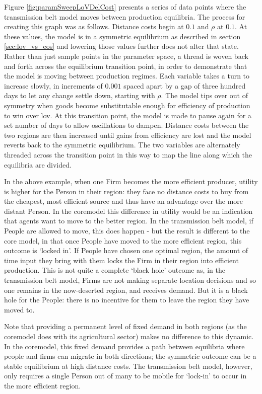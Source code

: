 Figure \ref{fig:paramSweepLoVDelCost} presents a series of data points where the transmission belt model moves between production equilibria. The process for creating this graph was as follows. Distance costs begin at $0.1$ and $\rho$ at $0.1$. At these values, the model is in a symmetric equilibrium as described in section \ref{sec:lov_vs_eos} and lowering those values further does not alter that state. Rather than just sample points in the parameter space, a thread is woven back and forth across the equilibrium transition point, in order to demonstrate that the model is moving between production regimes. Each variable takes a turn to increase slowly, in increments of $0.001$ spaced apart by a gap of three hundred days to let any change settle down, starting with $\rho$. The model tips over out of symmetry when goods become substitutable enough for efficiency of production to win over \gls{lov}. At this transition point, the model is made to pause again for a set number of days to allow oscillations to dampen. Distance costs between the two regions are then increased until gains from efficiency are lost and the model reverts back to the symmetric equilibrium. The two variables are alternately threaded across the transition point in this way to map the line along which the equilibria are divided.

In the above example, when one Firm becomes the more efficient producer, utility is higher for the Person in their region: they face no distance costs to buy from the cheapest, most efficient source and thus have an advantage over the more distant Person. In the \gls{coremodel} this difference in utility would be an indication that agents want to move to the better region. In the transmission belt model, if People are allowed to move, this does happen - but the result is different to the core model, in that once People have moved to the more efficient region, this outcome is `locked in'. If People have chosen one optimal region, the amount of time input they bring with them locks the Firm in their region into efficient production. This is not quite a complete `black hole' outcome as, in the transmission belt model, Firms are not making separate location decisions and so one remains in the now-deserted region, and receives demand. But it is a black hole for the People: there is no incentive for them to leave the region they have moved to.
 
Note that providing a permanent level of fixed demand in both regions (as the \gls{coremodel} does with its agricultural sector) makes no difference to this dynamic. In the \gls{coremodel}, this fixed demand provides a path between equilibria where people and firms can migrate in both directions; the symmetric outcome can be a stable equilibrium at high distance costs. The transmission belt model, however, only requires a single Person out of many to be mobile for `lock-in' to occur in the more efficient region.


